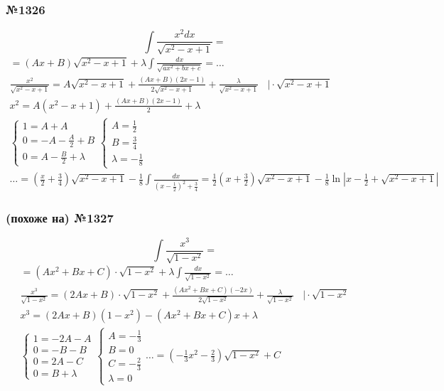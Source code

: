 \documentclass{article}
\begin{document}
\subsubsection{№1326}
\[
    \int \frac{x^2 dx}{\sqrt{x^2 - x + 1}} =
\]
\begin{gather*}
    = \left(Ax + B\right) \sqrt{x^2 - x + 1} + \lambda \int \frac{dx}{\sqrt{ax^2 + bx + c}} = \dots \\
    \frac{x^2}{\sqrt{x^2 - x + 1}} = A \sqrt{x^2 - x + 1} + \frac{(Ax + B)(2x - 1)}{2 \sqrt{x^2 - x + 1}} + \frac{\lambda}{\sqrt{x^2 - x + 1}} ~~~~\big| \cdot \sqrt{x^2 - x + 1} \\
    x^2 = A(x^2 - x + 1) + \frac{(Ax + B)(2x - 1)}{2} + \lambda \\
    \begin{cases}
        1 = A + A                \\
        0 = -A - \frac{A}{2} + B \\
        0 = A - \frac{B}{2} + \lambda
    \end{cases}
    \begin{cases}
        A = \frac{1}{2} \\
        B = \frac{3}{4} \\
        \lambda = -\frac{1}{8}
    \end{cases} \\
    \dots = \left(\frac{x}{2} + \frac{3}{4}\right) \sqrt{x^2 - x + 1} - \frac{1}{8} \int \frac{dx}{\left(x - \frac{1}{2}\right)^2 + \frac{3}{4}} = 
    \frac{1}{2} \left(x + \frac{3}{2}\right) \sqrt{x^2 - x + 1} - \frac{1}{8} \ln \left|x - \frac{1}{2} + \sqrt{x^2 - x + 1}\right|
\end{gather*}

\subsubsection{(похоже на) №1327}
\[
    \int \frac{x^3}{\sqrt{1 - x^2}} = 
\]
\begin{gather*}
    = \left(Ax^2 + Bx + C\right) \cdot \sqrt{1 - x^2} + \lambda \int \frac{dx}{\sqrt{1 - x^2}} = \dots \\
    \frac{x^3}{\sqrt{1 - x^2}} = (2Ax + B) \cdot \sqrt{1 - x^2} + \frac{(Ax^2 + Bx + C)(-2x)}{2\sqrt{1 - x^2}} + \frac{\lambda}{\sqrt{1 - x^2}} ~~~~\big| \cdot \sqrt{1 - x^2} \\
    x^3 = (2Ax + B)(1 - x^2) - (Ax^2 + Bx + C)x + \lambda \\
    \begin{cases}
        1 = -2A - A \\
        0 = -B - B  \\
        0 = 2A - C  \\
        0 = B + \lambda
    \end{cases} 
    \begin{cases}
        A = -\frac{1}{3} \\
        B = 0            \\
        C = -\frac{2}{3} \\
        \lambda = 0 
    \end{cases}
    \dots = \left(-\frac{1}{3}x^2 - \frac{2}{3}\right) \sqrt{1 - x^2} + C
\end{gather*}
\end{document}
